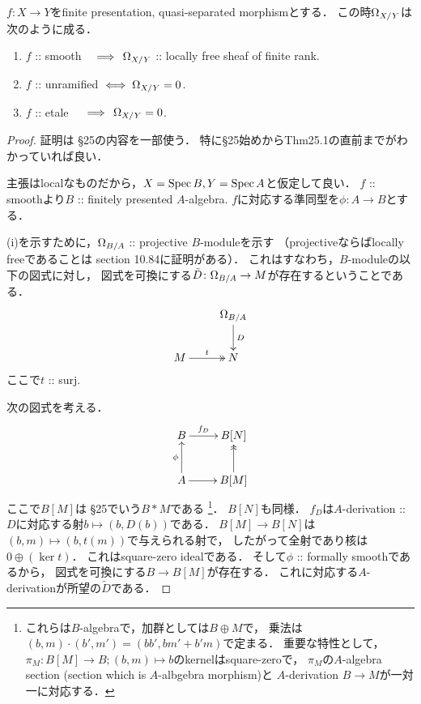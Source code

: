 \documentclass[a4paper]{jsarticle}
\begin{document}
\begin{Prop} \label{prop:dermod}
    $f \colon X \to Y$をfinite presentation, quasi-separated morphismとする．
    この時$\Omega_{X/Y}$は次のように成る．
\begin{enumerate}[label=(\roman*)]
    \item $f$ :: smooth \quad \ \,$\implies \,\Omega_{X/Y}$ :: locally free sheaf of finite rank.
    \item $f$ :: unramified $\iff \Omega_{X/Y}=0$.
    \item $f$ :: etale \qquad \ \ $\implies \, \Omega_{X/Y}=0$.
\end{enumerate}
\end{Prop}
\begin{proof}
    証明は\cite{Mat} \S 25の内容を一部使う．
    特に\S 25始めからThm25.1の直前までがわかっていれば良い．

    主張はlocalなものだから，$X=\operatorname{Spec} B, Y=\operatorname{Spec} A$と仮定して良い．
    $f$ :: smoothより$B$ :: finitely presented $A$-algebra.
    $f$に対応する準同型を$\phi \colon A \to B$とする．

    (i)を示すために，$\Omega_{B/A}$ :: projective $B$-moduleを示す
    （projectiveならばlocally freeであることは\cite{StacksProj} section 10.84に証明がある）．
    これはすなわち，$B$-moduleの以下の図式に対し，
    図式を可換にする$\tilde{D} \colon \Omega_{B/A} \to M$が存在するということである．
    \[\xymatrix{
        {} & \modDer_{B/A} \ar[d]^-{D}\\
        M \ar@{->>}[r]^-{t}& N
    }\]
    ここで$t$ :: surj.
    
    次の図式を考える．
    \[\xymatrix{
        B \ar[r]^-{f_D}& B[N] \\
        A \ar[r]\ar[u]^-{\phi}& B[M]\ar@{->>}[u]
    }\]
    ここで$B[M]$は\cite{Mat} \S 25でいう$B \ast M$である
    \footnote
    {
        これらは$B$-algebraで，加群としては$B \oplus M$で，
        乗法は$(b, m) \cdot (b', m')=(bb', bm'+b'm)$で定まる．
        重要な特性として，$\pi_M: B[M] \to B; (b, m) \mapsto b$のkernelはsquare-zeroで，
        $\pi_M$の$A$-algebra section (section which is $A$-albgebra morphism)と
        $A$-derivation $B \to M$が一対一に対応する．
    }．
    $B[N]$も同様．
    $f_D$は$A$-derivation :: $D$に対応する射$b \mapsto (b, D(b))$である．
    $B[M] \to B[N]$は$(b, m) \mapsto (b, t(m))$で与えられる射で，
    したがって全射であり核は$0 \oplus (\ker t)$．
    これはsquare-zero idealである．
    そして$\phi$ :: formally smoothであるから，
    図式を可換にする$B \to B[M]$が存在する．
    これに対応する$A$-derivationが所望の$\tilde{D}$である．


\end{proof}
\end{document}
